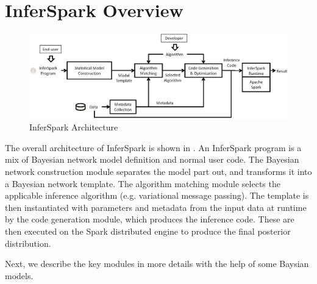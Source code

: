 \section{InferSpark Overview}
\label{sec:framework}

\begin{figure}[th]
\centering
    \includegraphics[width=0.8\linewidth]{figs/workflow_future.eps}
    \caption{InferSpark Architecture}
    \label{fig:workflow}
\end{figure}



The overall architecture of InferSpark is shown in .  An
InferSpark program is a mix of Bayesian network model definition and normal
user code. The Bayesian network construction module separates the model part
out, and transforms it into a Bayesian network template. The algorithm
matching module selects the applicable inference algorithm (e.g. variational
message passing). The template is
then instantiated with parameters and metadata from the input data at runtime
by the code generation module, which produces the inference code. These are
then executed on the Spark distributed engine to produce the final posterior
distribution.


Next, we describe the key modules in more details with the help of
some Baysian models. 

